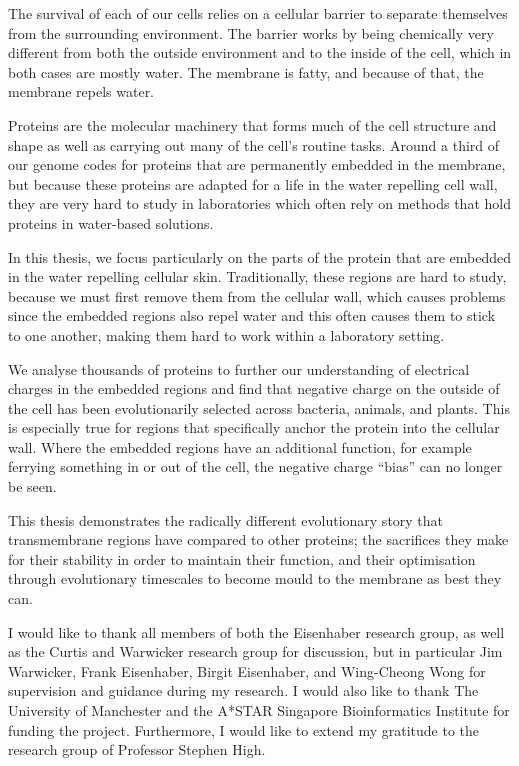\documentclass[12pt,PhD,twoside]{muthesis}
\begin{document}

The survival of each of our cells relies on a cellular barrier to separate themselves from the surrounding environment.
The barrier works by being chemically very different from both the outside environment and to the inside of the cell, which in both cases are mostly water.
The membrane is fatty, and because of that, the membrane repels water.

Proteins are the molecular machinery that forms much of the cell structure and shape as well as carrying out many of the cell's routine tasks.
Around a third of our genome codes for proteins that are permanently embedded in the membrane, but because these proteins are adapted for a life in the water repelling cell wall, they are very hard to study in laboratories which often rely on methods that hold proteins in water-based solutions.

In this thesis, we focus particularly on the parts of the protein that are embedded in the water repelling cellular skin.
Traditionally, these regions are hard to study, because we must first remove them from the cellular wall, which causes problems since the embedded regions also repel water and this often causes them to stick to one another, making them hard to work within a laboratory setting.

We analyse thousands of proteins to further our understanding of electrical charges in the embedded regions and find that negative charge on the outside of the cell has been evolutionarily selected across bacteria, animals, and plants.
This is especially true for regions that specifically anchor the protein into the cellular wall.
 Where the embedded regions have an additional function, for example ferrying something in or out of the cell, the negative charge ``bias'' can no longer be seen.

 This thesis demonstrates the radically different evolutionary story that transmembrane regions have compared to other proteins; the sacrifices they make for their stability in order to maintain their function, and their optimisation through evolutionary timescales to become mould to the membrane as best they can.




\afterabstract{} %

I would like to thank all members of both the Eisenhaber research group, as well as the Curtis and Warwicker research group for discussion, but in particular Jim Warwicker, Frank Eisenhaber, Birgit Eisenhaber, and Wing-Cheong Wong for supervision and guidance during my research. I would also like to thank The University of Manchester and the A*STAR Singapore Bioinformatics Institute for funding the project. Furthermore, I would like to extend my gratitude to the research group of Professor Stephen High.
\end{document}
